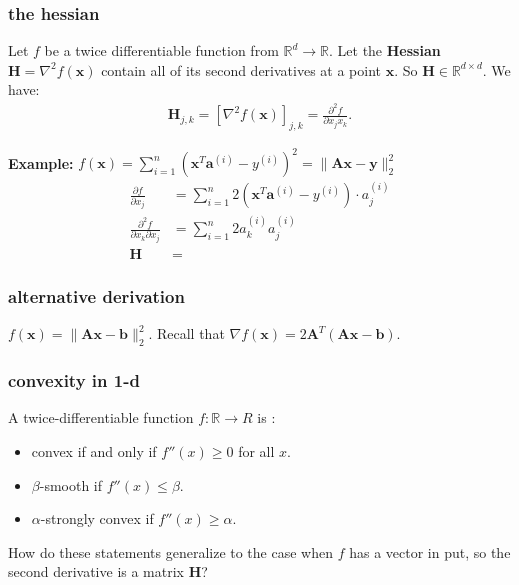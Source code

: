 \documentclass[compress]{beamer}
\newcommand{\bv}[1]{\mathbf{#1}}
\newcommand{\R}{\mathbb{R}}
\begin{document}
\begin{frame}[t]
	\frametitle{the hessian}
	Let $f$ be a twice differentiable function from $\R^d \rightarrow \R$. Let the \textbf{\alert{Hessian}} $\bv{H} = \nabla^2 f(\bv{x})$ contain all of its second derivatives at a point $\bv{x}$. So $\bv{H}\in \R^{d\times d}$.  We have:
	\begin{align*}
		\bv{H}_{j,k} = \left[\nabla^2 f(\bv{x})\right]_{j,k} = \frac{\partial^2 f}{\partial x_j x_k}. 
	\end{align*}
	
	\textbf{Example:} $f(\bv{x}) = \sum_{i=1}^n \left(\bv{x}^T\bv{a}^{(i)} - {y}^{(i)}\right)^2 = \|\bv{A}\bv{x} - \bv{y}\|_2^2$
	\begin{align*}
		\frac{\partial f}{\partial x_j} &= \sum_{i=1}^n 2\left(\bv{x}^T\bv{a}^{(i)} - {y}^{(i)}\right)\cdot a^{(i)}_j \\
		\frac{\partial^2 f}{\partial x_k\partial x_j} &= \sum_{i=1}^n 2a^{(i)}_k  a^{(i)}_j \\
		\bv{H} &=  
	\end{align*}
\end{frame}



\begin{frame}[t]
	\frametitle{alternative derivation}
	$f(\bv{x}) = \|\bv{A}\bv{x} - \bv{b}\|_2^2$. Recall that $\nabla f(\bv{x}) = 2\bv{A}^T(\bv{A}\bv{x}-\bv{b}).$
	
\end{frame}

\begin{frame}[t]
	\frametitle{convexity in 1-d}
	A twice-differentiable function $f:\R\rightarrow R$ is :
	\begin{itemize}
		\item convex if and only if $f''(x)\geq 0$ for all $x$.
		\item $\beta$-smooth if $f''(x) \leq \beta$. 
		\item $\alpha$-strongly convex if $f''(x) \geq \alpha$. 
	\end{itemize}
	\vspace{8em}
	How do these statements generalize to the case when $f$ has a vector in put, so the second derivative is a matrix $\bv{H}$?
\end{frame}
\end{document}
